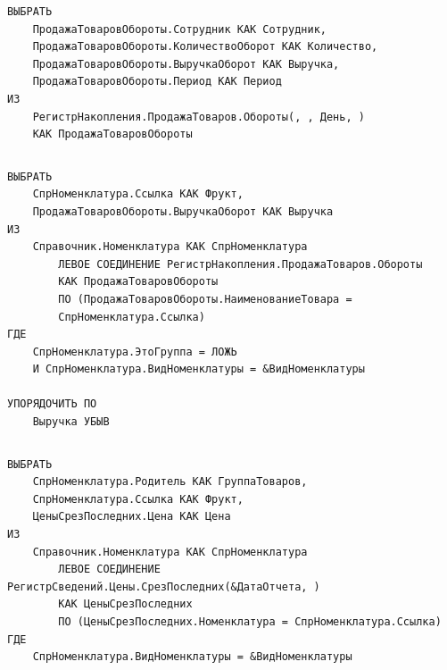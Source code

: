\documentclass[12pt,a4paper]{article}
\begin{document}
\begin{appendices}
\begin{lstlisting}[caption=Запрос к отчету <<Универсальный>>]
\end{lstlisting}

\begin{verbatim}
ВЫБРАТЬ
    ПродажаТоваровОбороты.Сотрудник КАК Сотрудник,
    ПродажаТоваровОбороты.КоличествоОборот КАК Количество,
    ПродажаТоваровОбороты.ВыручкаОборот КАК Выручка,
    ПродажаТоваровОбороты.Период КАК Период
ИЗ
    РегистрНакопления.ПродажаТоваров.Обороты(, , День, )
    КАК ПродажаТоваровОбороты
\end{verbatim}

\begin{lstlisting}[caption=Запрос к отчету <<Рейтинг работников>>]
\end{lstlisting}

\begin{verbatim}
ВЫБРАТЬ
    СпрНоменклатура.Ссылка КАК Фрукт,
    ПродажаТоваровОбороты.ВыручкаОборот КАК Выручка
ИЗ
    Справочник.Номенклатура КАК СпрНоменклатура
        ЛЕВОЕ СОЕДИНЕНИЕ РегистрНакопления.ПродажаТоваров.Обороты
        КАК ПродажаТоваровОбороты
        ПО (ПродажаТоваровОбороты.НаименованиеТовара =
        СпрНоменклатура.Ссылка)
ГДЕ
    СпрНоменклатура.ЭтоГруппа = ЛОЖЬ
    И СпрНоменклатура.ВидНоменклатуры = &ВидНоменклатуры

УПОРЯДОЧИТЬ ПО
    Выручка УБЫВ
\end{verbatim}

\begin{lstlisting}[caption=Запрос к отчету <<Рейтинг фруктов>>]
\end{lstlisting}

\begin{verbatim}
ВЫБРАТЬ
    СпрНоменклатура.Родитель КАК ГруппаТоваров,
    СпрНоменклатура.Ссылка КАК Фрукт,
    ЦеныСрезПоследних.Цена КАК Цена
ИЗ
    Справочник.Номенклатура КАК СпрНоменклатура
        ЛЕВОЕ СОЕДИНЕНИЕ РегистрСведений.Цены.СрезПоследних(&ДатаОтчета, )
        КАК ЦеныСрезПоследних
        ПО (ЦеныСрезПоследних.Номенклатура = СпрНоменклатура.Ссылка)
ГДЕ
    СпрНоменклатура.ВидНоменклатуры = &ВидНоменклатуры
\end{verbatim}

\begin{lstlisting}[caption=Запрос к отчету <<Перечень фруктов>>]
\end{lstlisting}
\end{appendices}
\end{document}
